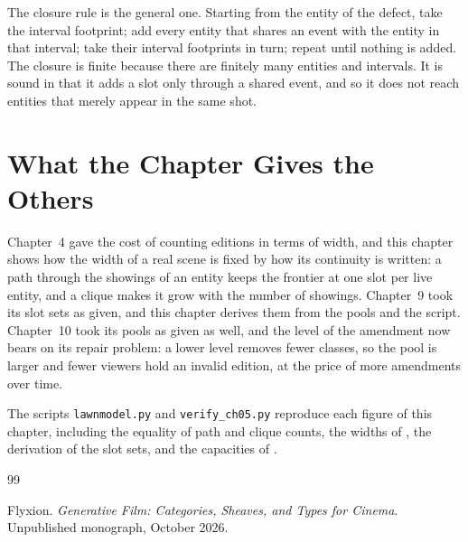 \documentclass[11pt,twoside,openright]{book}
\theoremstyle{plain}
\theoremstyle{definition}
\theoremstyle{remark}
\begin{document}
The closure rule is the general one. Starting from the entity of the defect, take the interval footprint; add every entity that shares an event with the entity in that interval; take their interval footprints in turn; repeat until nothing is added. The closure is finite because there are finitely many entities and intervals. It is sound in that it adds a slot only through a shared event, and so it does not reach entities that merely appear in the same shot.

\section{What the Chapter Gives the Others}\label{sec:gives}

Chapter~4 gave the cost of counting editions in terms of width, and this chapter shows how the width of a real scene is fixed by how its continuity is written: a path through the showings of an entity keeps the frontier at one slot per live entity, and a clique makes it grow with the number of showings. Chapter~9 took its slot sets as given, and this chapter derives them from the pools and the script. Chapter~10 took its pools as given as well, and the level of the amendment now bears on its repair problem: a lower level removes fewer classes, so the pool is larger and fewer viewers hold an invalid edition, at the price of more amendments over time.

The scripts \texttt{lawnmodel.py} and \texttt{verify\_ch05.py} reproduce each figure of this chapter, including the equality of path and clique counts, the widths of , the derivation of the slot sets, and the capacities of .

\begin{thebibliography}{99}

Flyxion.
\newblock \emph{Generative Film: Categories, Sheaves, and Types for Cinema}.
\newblock Unpublished monograph, October 2026.

\end{thebibliography}
\end{document}
